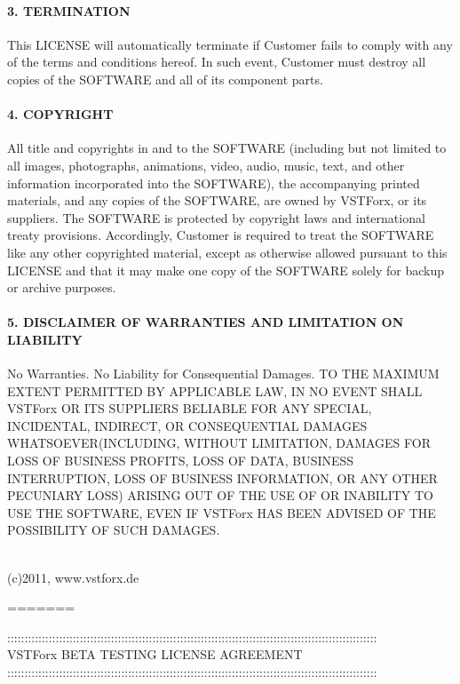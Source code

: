 \paragraph{3. TERMINATION}

This LICENSE will automatically terminate if Customer fails to comply with any of the terms and conditions hereof. In such event, Customer must destroy all copies of the SOFTWARE and all of its component parts.

\paragraph{4. COPYRIGHT}

All title and copyrights in and to the SOFTWARE (including but not limited to all images, photographs, animations, video, audio, music, text, and other information incorporated into the SOFTWARE), the accompanying printed materials, and any copies of the SOFTWARE, are owned by VSTForx, or its suppliers. The SOFTWARE is protected by copyright laws and international treaty provisions. Accordingly, Customer is required to treat the SOFTWARE like any other copyrighted material, except as otherwise allowed pursuant to this LICENSE and that it may make one copy of the SOFTWARE solely for backup or archive purposes.

\paragraph{5. DISCLAIMER OF WARRANTIES AND LIMITATION ON LIABILITY}

No Warranties. No Liability for Consequential Damages. TO THE MAXIMUM EXTENT PERMITTED BY APPLICABLE LAW, IN NO EVENT SHALL VSTForx OR ITS SUPPLIERS BELIABLE FOR ANY SPECIAL, INCIDENTAL, INDIRECT, OR CONSEQUENTIAL DAMAGES WHATSOEVER(INCLUDING, WITHOUT LIMITATION, DAMAGES FOR LOSS OF BUSINESS PROFITS, LOSS OF DATA, BUSINESS INTERRUPTION, LOSS OF BUSINESS INFORMATION, OR ANY OTHER PECUNIARY LOSS) ARISING OUT OF THE USE OF OR INABILITY TO USE THE SOFTWARE, EVEN IF VSTForx HAS BEEN ADVISED OF THE POSSIBILITY OF SUCH DAMAGES.
\\\\
\begin{flushright}
(c)2011, www.vstforx.de
\end{flushright}
=======

\begin{center}
:::::::::::::::::::::::::::::::::::::::::::::::::::::::::::::::::::::::::::::::::::::::::::::::::::::::::::\\
VSTForx BETA TESTING LICENSE AGREEMENT\\
:::::::::::::::::::::::::::::::::::::::::::::::::::::::::::::::::::::::::::::::::::::::::::::::::::::::::::\\
\end{center}
